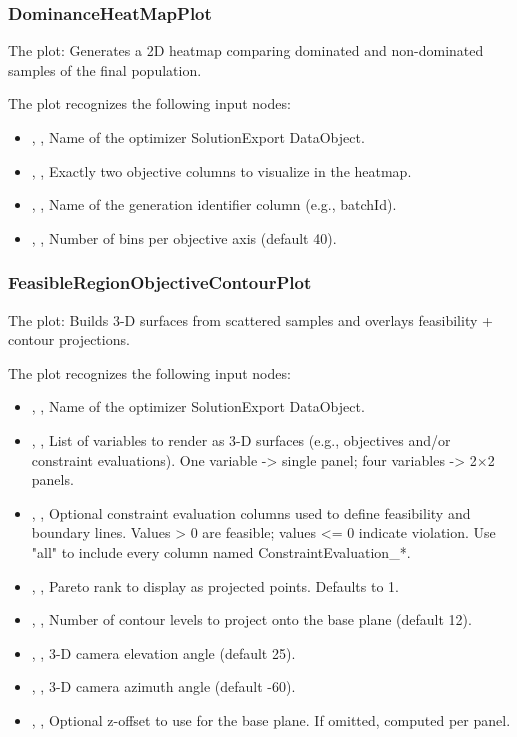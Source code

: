 \subsubsection{DominanceHeatMapPlot}
The   plot: Generates a 2D heatmap comparing dominated and non-dominated samples of the final population.

The  plot recognizes the following input nodes:
\begin{itemize}
  \item {}, , Name of the optimizer SolutionExport DataObject.
  \item {}, , Exactly two objective columns to visualize in the heatmap.
  \item {}, , Name of the generation identifier column (e.g., batchId).
  \item {}, , Number of bins per objective axis (default 40).
\end{itemize}

\subsubsection{FeasibleRegionObjectiveContourPlot}
The   plot: Builds 3-D surfaces from scattered samples and overlays feasibility + contour projections.

The  plot recognizes the following input nodes:
\begin{itemize}
  \item {}, , Name of the optimizer SolutionExport DataObject.
  \item {}, , List of variables to render as 3-D surfaces (e.g., objectives and/or constraint evaluations). One variable -\textgreater{} single panel; four variables -\textgreater{} 2\(\times\)2 panels.
  \item {}, , Optional constraint evaluation columns used to define feasibility and boundary lines. Values \textgreater{} 0 are feasible; values \textless{}= 0 indicate violation. Use "all" to include every column named ConstraintEvaluation\_*.
  \item {}, , Pareto rank to display as projected points. Defaults to 1.
  \item {}, , Number of contour levels to project onto the base plane (default 12).
  \item {}, , 3-D camera elevation angle (default 25).
  \item {}, , 3-D camera azimuth angle (default -60).
  \item {}, , Optional z-offset to use for the base plane. If omitted, computed per panel.
\end{itemize}


